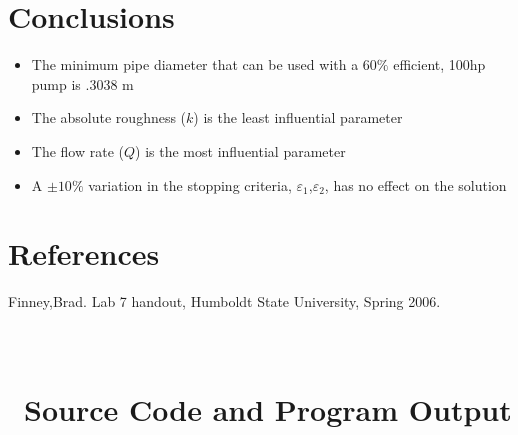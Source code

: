 \documentclass[titlepage,11pt]{article}
\begin{document}
\section{Conclusions}
\begin{itemize}
  \item{The minimum pipe diameter that can be used with a $60\%$ efficient, 100hp pump is .3038 m}
  \item{The absolute roughness ($k$) is the least influential parameter}
  \item{The flow rate ($Q$) is the most influential parameter}
  \item{A $\pm10\%$ variation in the stopping criteria,
  $\varepsilon_1$,$\varepsilon_2$, has no effect on the solution}
\end{itemize}

\section{References}

Finney,Brad. Lab 7 handout, Humboldt State University, Spring 2006.

\appendix
\newcommand{\appsection}[1]{\let\oldthesection\thesection
  \renewcommand{\thesection}{Appendix \oldthesection}
  \section{#1}\let\thesection\oldthesection}
\appsection{\\~Source Code and Program Output} \label{sec:source}
\end{document}
